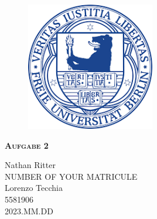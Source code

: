 \documentclass{report}
\begin{document}
\begin{center}
	
\end{center}
    \begin{figure}[htbp!]
        \begin{center}
            \includegraphics[width=0.5\textwidth]{Immagini/FUlogo.png}
        \end{center}
    \end{figure}
    
    {\centering\scshape\Large\bfseries Aufgabe 2
    \begin{center}
        Nathan Ritter  \\ NUMBER OF YOUR MATRICULE \\
        Lorenzo Tecchia \\ 5581906  \\ 2023.MM.DD
    \end{center}}


    \newpage
    
    \tableofcontents
    
    
    
    
    
\end{document}

